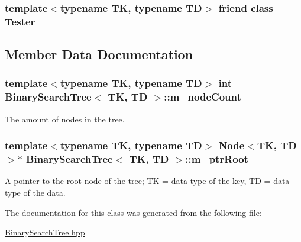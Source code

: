 \subsubsection[{\texorpdfstring{Tester}{Tester}}]{\setlength{\rightskip}{0pt plus 5cm}template$<$typename TK, typename TD$>$ friend class {\bf Tester}\hspace{0.3cm}{\ttfamily [friend]}}\hypertarget{classBinarySearchTree_a8da748c2b0afd5c6b23e931591f217de}{}\label{classBinarySearchTree_a8da748c2b0afd5c6b23e931591f217de}


\subsection{Member Data Documentation}
\subsubsection[{\texorpdfstring{m\+\_\+node\+Count}{m_nodeCount}}]{\setlength{\rightskip}{0pt plus 5cm}template$<$typename TK, typename TD$>$ int {\bf Binary\+Search\+Tree}$<$ TK, TD $>$\+::m\+\_\+node\+Count\hspace{0.3cm}{\ttfamily [private]}}\hypertarget{classBinarySearchTree_a619940c056dcb8aa8246ada1e7ca2e2c}{}\label{classBinarySearchTree_a619940c056dcb8aa8246ada1e7ca2e2c}


The amount of nodes in the tree. 

\subsubsection[{\texorpdfstring{m\+\_\+ptr\+Root}{m_ptrRoot}}]{\setlength{\rightskip}{0pt plus 5cm}template$<$typename TK, typename TD$>$ {\bf Node}$<$TK, TD$>$$\ast$ {\bf Binary\+Search\+Tree}$<$ TK, TD $>$\+::m\+\_\+ptr\+Root\hspace{0.3cm}{\ttfamily [private]}}\hypertarget{classBinarySearchTree_a721f28bd510e040b8573bdb1a19744ba}{}\label{classBinarySearchTree_a721f28bd510e040b8573bdb1a19744ba}


A pointer to the root node of the tree; TK = data type of the key, TD = data type of the data. 



The documentation for this class was generated from the following file\+:\begin{DoxyCompactItemize}
\item 
\hyperlink{BinarySearchTree_8hpp}{Binary\+Search\+Tree.\+hpp}\end{DoxyCompactItemize}
